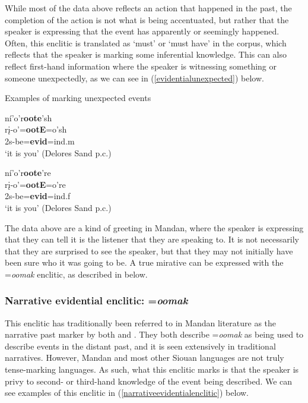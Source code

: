 While most of the data above reflects an action that happened in the past, the completion of the action is not what is being accentuated, but rather that the speaker is expressing that the event has apparently or seemingly happened. Often, this enclitic is translated as `must' or `must have' in the corpus, which reflects that the speaker is marking some inferential knowledge. This can also reflect first-hand information where the speaker is witnessing something or someone unexpectedly, as we can see in (\ref{evidentialunexpected}) below.

\begin{exe}

\item\label{evidentialunexpected} Examples of marking unexpected events
	
	\begin{xlist}
	
	\item\label{evidentialunexpected1}
	\glll ní'o'r\textbf{oote}'sh\\
	rį-o'=\textbf{ootE}=o'sh\\
	2s-\textnormal{be}=\textbf{evid}=ind.m\\
	\glt `it is you' (Delores Sand p.c.)

	\item\label{evidentialunexpected2}
	\glll ní'o'r\textbf{oote}'re\\
	rį-o'=\textbf{ootE}=o're\\
	2s-\textnormal{be}=\textbf{evid}=ind.f\\
	\glt `it is you' (Delores Sand p.c.)	
	
	\end{xlist}

\end{exe}

The data above are a kind of greeting in Mandan, where the speaker is expressing that they can tell it is the listener that they are speaking to. It is not necessarily that they are surprised to see the speaker, but that they may not initially have been sure who it was going to be. A true mirative can be expressed with the =\textit{oomak} enclitic, as described in  below.

\subsubsection{Narrative evidential enclitic: =\textit{oomak}}\label{SubNARR}

This enclitic has traditionally been referred to in Mandan literature as the narrative past marker by both \citet[18]{kennard1936} and \citet[474]{hollow1970}. They both describe =\textit{oomak} as being used to describe events in the distant past, and it is seen extensively in traditional narratives. However, Mandan and most other Siouan languages are not truly tense-marking languages. As such, what this enclitic marks is that the speaker is privy to second- or third-hand knowledge of the event being described. We can see examples of this enclitic in (\ref{narrativeevidentialenclitic}) below.


